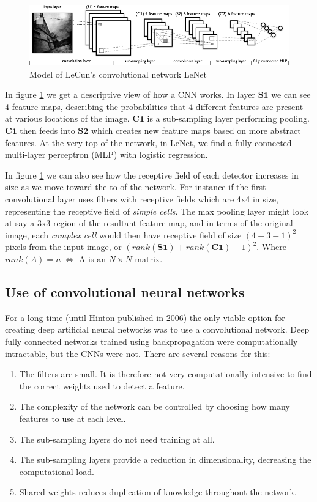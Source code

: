 \documentclass[11pt]{article}
\begin{document}
\begin{figure}[htb]
  \centering
  \includegraphics[width=\textwidth]{mylenet.png}
  \caption{Model of LeCun's convolutional network LeNet}
  \label{fig:mylenet}
\end{figure}

In figure \ref{fig:mylenet} we get a descriptive view of how a CNN works.  In layer $\mathbf{S1}$ we can see 4 feature maps, describing the probabilities that 4 different features are present at various locations of the image.  $\mathbf{C1}$ is a sub-sampling layer performing pooling.  $\mathbf{C1}$ then feeds into $\mathbf{S2}$ which creates new feature maps based on more abstract features.  At the very top of the network, in LeNet, we find a fully connected multi-layer perceptron (MLP) with logistic regression.

In figure \ref{fig:mylenet} we can also see how the receptive field of each detector increases in size as we move toward the to of the network.  For instance if the first convolutional layer uses filters with receptive fields which are 4x4 in size, representing the receptive field of \textit{simple cells}.  The max pooling layer might look at say a 3x3 region of the resultant feature map, and in terms of the original image, each \textit{complex cell} would then have receptive field of size $(4 + 3 - 1)^2$ pixels from the input image, or $(rank(\mathbf{S1}) + rank(\mathbf{C1}) - 1)^2$.  Where $rank(A) = n\ \Leftrightarrow$ A is an $N\times N$ matrix.

\subsection{Use of convolutional neural networks}

For a long time (until Hinton published \cite{hinton06} in 2006) the only viable option for creating deep artificial neural networks was to use a convolutional network.  Deep fully connected networks trained using backpropagation were computationally intractable, but the CNNs were not.  There are several reasons for this:

\begin{enumerate}
 \item The filters are small.  It is therefore not very computationally intensive to find the correct weights used to detect a feature.
 \item The complexity of the network can be controlled by choosing how many features to use at each level.
 \item The sub-sampling layers do not need training at all.
 \item The sub-sampling layers provide a reduction in dimensionality, decreasing the computational load.
 \item Shared weights reduces duplication of knowledge throughout the network.
\end{enumerate}
\end{document}
